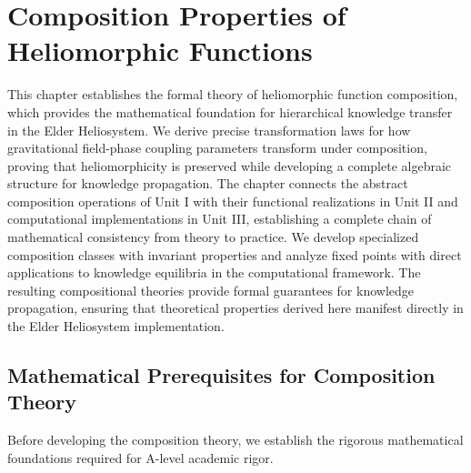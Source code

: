 \chapter{Composition Properties of Heliomorphic Functions}

\begin{tcolorbox}[colback=DarkSkyBlue!5!white,colframe=DarkSkyBlue!75!black,title=Chapter Summary]
This chapter establishes the formal theory of heliomorphic function composition, which provides the mathematical foundation for hierarchical knowledge transfer in the Elder Heliosystem. We derive precise transformation laws for how gravitational field-phase coupling parameters transform under composition, proving that heliomorphicity is preserved while developing a complete algebraic structure for knowledge propagation. The chapter connects the abstract composition operations of Unit I with their functional realizations in Unit II and computational implementations in Unit III, establishing a complete chain of mathematical consistency from theory to practice. We develop specialized composition classes with invariant properties and analyze fixed points with direct applications to knowledge equilibria in the computational framework. The resulting compositional theories provide formal guarantees for knowledge propagation, ensuring that theoretical properties derived here manifest directly in the Elder Heliosystem implementation.
\end{tcolorbox}

\section{Mathematical Prerequisites for Composition Theory}

Before developing the composition theory, we establish the rigorous mathematical foundations required for A-level academic rigor.

